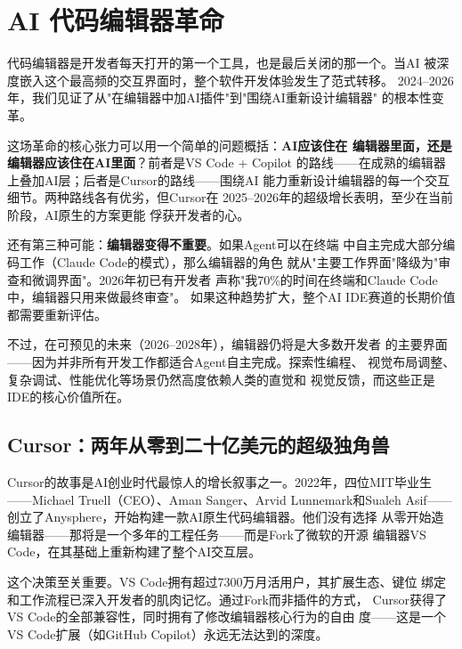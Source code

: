 \section{AI 代码编辑器革命}
\label{sec:devtools-editors}

代码编辑器是开发者每天打开的第一个工具，也是最后关闭的那一个。当AI
被深度嵌入这个最高频的交互界面时，整个软件开发体验发生了范式转移。
2024--2026年，我们见证了从"在编辑器中加AI插件"到"围绕AI重新设计编辑器"
的根本性变革。

这场革命的核心张力可以用一个简单的问题概括：\textbf{AI应该住在
编辑器里面，还是编辑器应该住在AI里面}？前者是VS Code + Copilot
的路线——在成熟的编辑器上叠加AI层；后者是Cursor的路线——围绕AI
能力重新设计编辑器的每一个交互细节。两种路线各有优劣，但Cursor在
2025--2026年的超级增长表明，至少在当前阶段，AI原生的方案更能
俘获开发者的心。

还有第三种可能：\textbf{编辑器变得不重要}。如果Agent可以在终端
中自主完成大部分编码工作（Claude Code的模式），那么编辑器的角色
就从"主要工作界面"降级为"审查和微调界面"。2026年初已有开发者
声称"我70\%的时间在终端和Claude Code中，编辑器只用来做最终审查"。
如果这种趋势扩大，整个AI IDE赛道的长期价值都需要重新评估。

不过，在可预见的未来（2026--2028年），编辑器仍将是大多数开发者
的主要界面——因为并非所有开发工作都适合Agent自主完成。探索性编程、
视觉布局调整、复杂调试、性能优化等场景仍然高度依赖人类的直觉和
视觉反馈，而这些正是IDE的核心价值所在。

\subsection{Cursor：两年从零到二十亿美元的超级独角兽}
\label{subsec:cursor}

Cursor的故事是AI创业时代最惊人的增长叙事之一。2022年，四位MIT毕业生
——Michael Truell（CEO）、Aman Sanger、Arvid Lunnemark和Sualeh
Asif——创立了Anysphere，开始构建一款AI原生代码编辑器。他们没有选择
从零开始造编辑器——那将是一个多年的工程任务——而是Fork了微软的开源
编辑器VS Code，在其基础上重新构建了整个AI交互层。

这个决策至关重要。VS Code拥有超过7300万月活用户，其扩展生态、键位
绑定和工作流程已深入开发者的肌肉记忆。通过Fork而非插件的方式，
Cursor获得了VS Code的全部兼容性，同时拥有了修改编辑器核心行为的自由
度——这是一个VS Code扩展（如GitHub Copilot）永远无法达到的深度。

